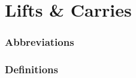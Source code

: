 \documentclass[../../EMT-169.tex]{subfiles}
\begin{document}
\setcounter{chapter}{7}
\label{ch:chapter8}
\clearpage
	
	
	
\chapter{Lifts \& Carries}

\subsection*{Abbreviations}

\subsection*{Definitions}
\end{document}
